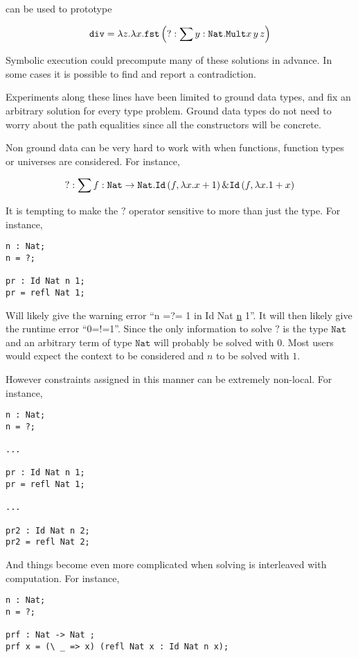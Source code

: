 can be used to prototype

\[
\mathtt{div}=\lambda z.\lambda x.\mathtt{fst}\left(?:\sum y:\mathtt{Nat}{}.\mathtt{Mult}x\,y\,z\right)
\]

Symbolic execution could precompute many of these solutions in advance.
In some cases it is possible to find and report a contradiction. 

Experiments along these lines have been limited to ground data types, and fix an arbitrary solution for every type problem.
Ground data types do not need to worry about the path equalities since all the constructors will be concrete.

Non ground data can be very hard to work with when functions, function types or universes are considered.
For instance,

\[
?:\sum f:\mathtt{Nat}{}\rightarrow\mathtt{Nat}{}.\mathtt{Id}\left(f,\lambda x.x+1\right)\&\mathtt{Id}\left(f,\lambda x.1+x\right)
\]

It is tempting to make the $?$ operator sensitive to more than just the type.
For instance,

\begin{lstlisting}
n : Nat;
n = ?;

pr : Id Nat n 1;
pr = refl Nat 1;
\end{lstlisting}

Will likely give the warning error ``n =?= 1 in Id Nat \uline{n} 1''.
It will then likely give the runtime error ``0=!=1''.
Since the only information to solve $\mathtt{?}$ is the type $\mathtt{Nat}$ and an arbitrary term of type $\mathtt{Nat}$ will probably be solved with 0.
Most users would expect the context to be considered and $n$ to be solved with $1$.

However constraints assigned in this manner can be extremely non-local.
For instance,

\begin{lstlisting}
n : Nat;
n = ?;

...

pr : Id Nat n 1;
pr = refl Nat 1;

...

pr2 : Id Nat n 2;
pr2 = refl Nat 2;
\end{lstlisting}

And things become even more complicated when solving is interleaved with computation.
For instance,

\begin{lstlisting}
n : Nat;
n = ?;

prf : Nat -> Nat ;
prf x = (\ _ => x) (refl Nat x : Id Nat n x);
\end{lstlisting}


